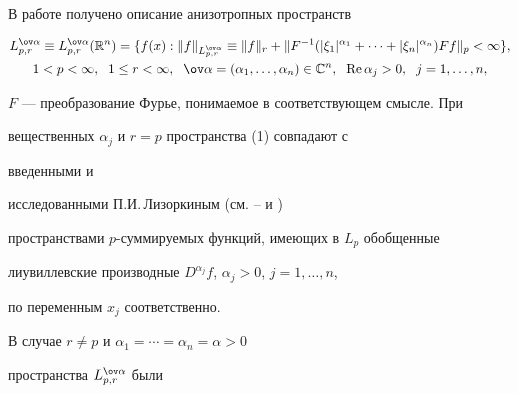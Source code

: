 \date{}







\pagestyle{plain} %













\maketitle


\label{begin}





В работе получено описание анизотропных пространств


\begin{gather}


\spaceL\equiv \spaceL(\Bbb R^n)=\{f(x):\|f\|_{\spaceL}\equiv


\|f\|_r+\|F^{-1}(|\xi_1|^{\alpha_1}+\dotsb+|\xi_n|^{\alpha_n})


Ff\|_p<\infty\},\\


1<p<\infty,\ \;1\le r<\infty,\ \;


\ov\alpha=(\alpha_1,\dotsc,\alpha_n)\in\Bbb C^n,\ \; \re\alpha_j>0,


\ \;j=1,\dotsc,n,\notag


\end{gather}


$F$ --- преобразование Фурье, понимаемое в соответствующем смысле. При


вещественных $\alpha_j$ и $r=p$ пространства (1) совпадают с


введенными и


исследованными П.И.\,Лизоркиным (см. \cite{1}--\cite{4} и \cite{5})


пространствами $p$-суммируемых функций, имеющих в $L_p$ обобщенные


лиувиллевские производные $D^{\alpha_j}f$, $\alpha_j>0$, $j=1,\dotsc,n$,


по переменным $x_j$ соответственно.


В случае $r\ne p$ и $\alpha_1=\dotsb=\alpha_n=\alpha>0$


пространства $\spaceL$ были



